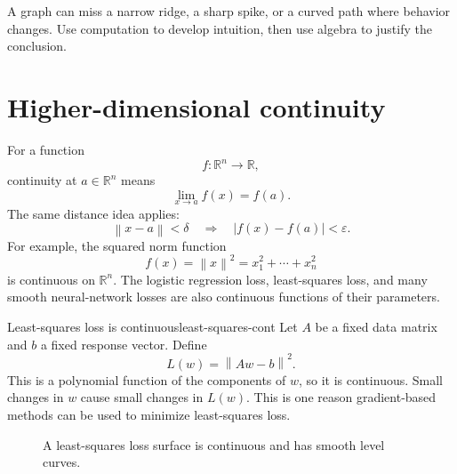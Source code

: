 \documentclass[11pt]{article}
\newcommand{\R}{\mathbb R}
\newcommand{\norm}[1]{\left\lVert #1\right\rVert}
\newcommand{\abs}[1]{\left\lvert #1\right\rvert}
\begin{document}
\begin{warningbox}
A graph can miss a narrow ridge, a sharp spike, or a curved path where behavior changes. Use computation to develop intuition, then use algebra to justify the conclusion.
\end{warningbox}

\section{Higher-dimensional continuity}

For a function
\[
f:\R^n\to\R,
\]
continuity at $a\in\R^n$ means
\[
\lim_{x\to a} f(x)=f(a).
\]
The same distance idea applies:
\[
\norm{x-a}<\delta
\quad \Longrightarrow \quad
\abs{f(x)-f(a)}<\varepsilon.
\]
For example, the squared norm function
\[
f(x)=\norm{x}^2=x_1^2+\cdots+x_n^2
\]
is continuous on $\R^n$. The logistic regression loss, least-squares loss, and many smooth neural-network losses are also continuous functions of their parameters.

\begin{workedexample}{Least-squares loss is continuous}{least-squares-cont}
Let $A$ be a fixed data matrix and $b$ a fixed response vector. Define
\[
L(w)=\norm{Aw-b}^2.
\]
This is a polynomial function of the components of $w$, so it is continuous. Small changes in $w$ cause small changes in $L(w)$. This is one reason gradient-based methods can be used to minimize least-squares loss.
\end{workedexample}

\begin{figure}[H]
\centering
{}
\caption{A least-squares loss surface is continuous and has smooth level curves.}
\end{figure}
\end{document}
